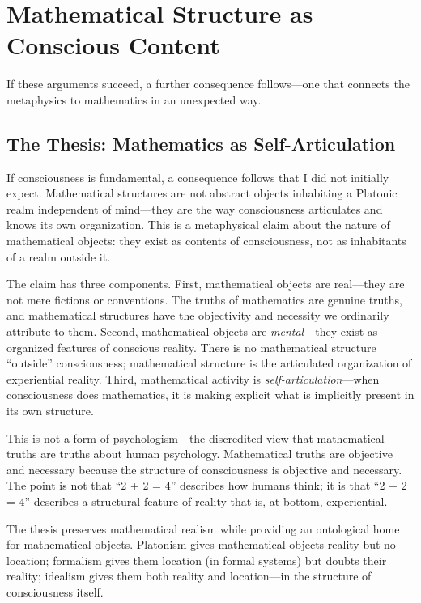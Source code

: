 \documentclass[11pt,a4paper]{article}
\theoremstyle{definition}
\theoremstyle{plain}
\theoremstyle{remark}
\begin{document}
\section{Mathematical Structure as Conscious Content}\label{sec:math}

If these arguments succeed, a further consequence follows---one that connects the metaphysics to mathematics in an unexpected way.

\subsection{The Thesis: Mathematics as Self-Articulation}\label{sec:thesis}

If consciousness is fundamental, a consequence follows that I did not initially expect. Mathematical structures are not abstract objects inhabiting a Platonic realm independent of mind---they are the way consciousness articulates and knows its own organization. This is a metaphysical claim about the nature of mathematical objects: they exist as contents of consciousness, not as inhabitants of a realm outside it.

The claim has three components. First, mathematical objects are real---they are not mere fictions or conventions. The truths of mathematics are genuine truths, and mathematical structures have the objectivity and necessity we ordinarily attribute to them. Second, mathematical objects are \textit{mental}---they exist as organized features of conscious reality. There is no mathematical structure ``outside'' consciousness; mathematical structure is the articulated organization of experiential reality. Third, mathematical activity is \textit{self-articulation}---when consciousness does mathematics, it is making explicit what is implicitly present in its own structure.

This is not a form of psychologism---the discredited view that mathematical truths are truths about human psychology. Mathematical truths are objective and necessary because the structure of consciousness is objective and necessary. The point is not that ``2 + 2 = 4'' describes how humans think; it is that ``2 + 2 = 4'' describes a structural feature of reality that is, at bottom, experiential.

The thesis preserves mathematical realism while providing an ontological home for mathematical objects. Platonism gives mathematical objects reality but no location; formalism gives them location (in formal systems) but doubts their reality; idealism gives them both reality and location---in the structure of consciousness itself.
\end{document}
